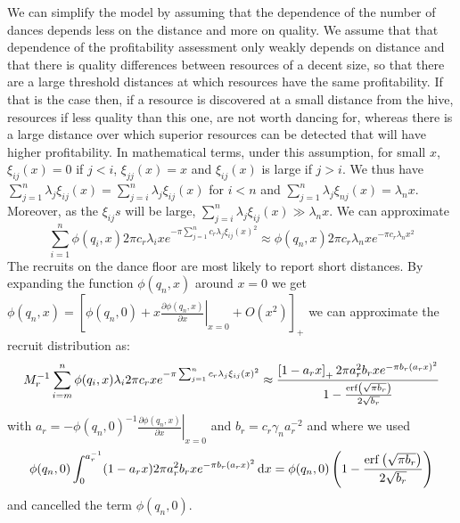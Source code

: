 \documentclass[12pt,letter]{amsart}
\newcommand{\df}[0]{{\,\rm d }}
\begin{document}
We can simplify the model by assuming that the dependence of the number of dances depends less on the distance and more on quality. We assume that that dependence of the profitability assessment only weakly depends on distance and that there is quality differences between resources of a decent size, so that there are a large threshold distances at which resources have the same profitability. If that is the case then, if a resource is discovered at a small distance from the hive, resources if less quality than this one, are not worth dancing for, whereas there is a large distance over which superior resources can be detected that will have higher profitability. In mathematical terms, under this assumption, for small $x$, $\xi_{ij}(x)=0$ if $j<i$, $\xi_{jj}(x)=x$ and $\xi_{ij}(x)$ is large if $j>i$. We thus have $\sum_{j=1}^n  \lambda_j \xi_{ij}(x)=\sum_{j=i}^n  \lambda_j \xi_{ij}(x)$ for $i<n$ and $\sum_{j=1}^n  \lambda_j \xi_{nj}(x)=\lambda_n x.$ Moreover, as the $\xi_{ij}s$ will be large, $\sum_{j=i}^n  \lambda_j \xi_{ij}(x) \gg\lambda_n x.$  We can approximate
$$\sum_{i=1}^n  \phi(q_i,x)2 \pi c_r \lambda_i  x e^{- \pi \sum_{j=1}^n c_r \lambda_j \xi_{ij}(x)^2}\approx
\phi(q_n,x)2 \pi c_r \lambda_n  x e^{- \pi  c_r \lambda_n x^2}
$$
The recruits on the dance floor are most likely to report short distances. By expanding the function $ \phi(q_n, x)$ around $x=0$ we get $\phi(q_n, x)=\left[\phi(q_n, 0)+x\left. \frac{\partial \phi(q_n, x)}{\partial x}\right|_{x=0}+ O(x^2)\right]_+$ we can approximate the recruit distribution as:
$$M_r^{-1}\sum_{i=m}^n  \phi(q_i, x)\lambda_i2 \pi c_r  x e^{- \pi \sum_{j=1}^n c_r \lambda_j \xi_{ij}(x)^2}\approx  \frac{\left[1- a_r x\right]_+2 \pi a_r^2   b_r x e^{- \pi  b_r  (a_r x)^2}}{1-\frac{{\rm erf}\left(  \sqrt{\pi b_r}\right)}{2 \sqrt{b_r }}}$$
with $a_r=-\phi(q_n, 0)^{-1}\left. \frac{\partial \phi(q_n, x)}{\partial x}\right|_{x=0}$ and $b_r=c_r \gamma_n a_r^{-2}$
and where we used
$$\phi(q_n, 0)\int_{0}^{a_r^{-1}} (1- a_r x )2 \pi a_r^2   b_r x e^{- \pi  b_r  (a_r x)^2}\df x=\phi(q_n, 0)\left(1-\frac{{\rm erf}\left(  \sqrt{\pi b_r}\right)}{2 \sqrt{b_r }}\right)
$$ and cancelled the term $\phi(q_n, 0).$
\end{document}

